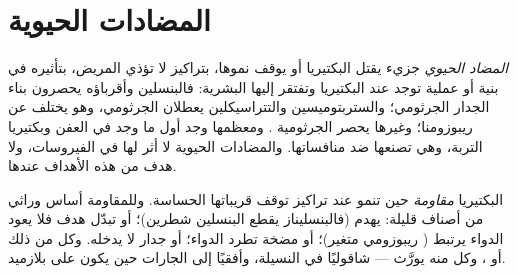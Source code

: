 \section{المضادات الحيوية}

\begin{definition}\label{def:g11:antibiotic-resistance:antibiotic}
\emph{المضاد الحيوي} جزيء يقتل البكتيريا أو يوقف
نموها، بتراكيز لا تؤذي  المريض، بتأثيره في بنية أو عملية توجد
عند البكتيريا وتفتقر إليها  البشرية: فالبنسلين وأقرباؤه يحصرون
بناء الجدار الجرثومي؛ والستربتوميسين والتتراسيكلين يعطلان 
الجرثومي، وهو يختلف عن ريبوزومنا؛ وغيرها يحصر  الجرثومية
. ومعظمها وجد أول ما وجد في العفن وبكتيريا التربة، وهي
تصنعها ضد منافساتها. والمضادات الحيوية لا أثر لها في الفيروسات، ولا
هدف من هذه الأهداف عندها.
\end{definition}

\begin{proposition}\label{prop:g11:antibiotic-resistance:mechanisms}
البكتيريا \emph{مقاومة}  حين
تنمو عند تراكيز توقف قريباتها الحساسة. وللمقاومة أساس وراثي من أصناف
قليلة:   يهدم  (فالبنسليناز يقطع البنسلين
شطرين)؛ أو  تبدّل هدف  فلا يعود الدواء يرتبط (
ريبوزومي متغير)؛ أو مضخة تطرد الدواء؛ أو جدار لا يدخله. وكل من ذلك
 أو ، وكل منه يورَّث --- شاقوليًا في النسيلة، وأفقيًا إلى
الجارات حين يكون على بلازميد.
\end{proposition}
\admitted

